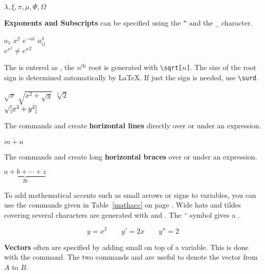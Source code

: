 \begin{example}
$\lambda,\xi,\pi,\mu,\Phi,\Omega$
\end{example}
 
\textbf{Exponents and Subscripts} can be specified using
the \verb|^| and the \verb|_| character.

\begin{example}
$a_{1}$ \qquad $x^{2}$ \qquad
$e^{-\alpha t}$ \qquad
$a^{3}_{ij}$\\
$e^{x^2} \neq {e^x}^2$
\end{example}

The \textbf{} is entered as , the
$n^\mathrm{th}$ root is generated with \verb|\sqrt[|$n$\verb|]|. The size of
the root sign is determined automatically by \LaTeX. If just the sign
is needed, use \verb|\surd|.

\begin{example}
$\sqrt{x}$ \qquad 
$\sqrt{ x^{2}+\sqrt{y} }$ 
\qquad $\sqrt[3]{2}$\\[3pt]
$\surd[x^2 + y^2]$
\end{example}

The commands  and  create
\textbf{horizontal lines} directly over or under an expression.
\begin{example}
$\overline{m+n}$
\end{example}

The commands  and  create
long \textbf{horizontal braces} over or under an expression.
\begin{example}
$\underbrace{ a+b+\cdots+z }_{26}$
\end{example}

 To add mathematical accents such as small
arrows or  signs to variables, you can use the commands
given in Table~\ref{mathacc} on page \pageref{mathacc}.  Wide hats and
tildes covering several characters are generated with 
and .  The \verb|'| symbol gives a
.

\begin{example}
\begin{displaymath}
y=x^{2}\qquad y'=2x\qquad y''=2
\end{displaymath}
\end{example}

\textbf{Vectors} often are specified by adding small
 on top of a variable. This is done with the
 command. The two commands  and
 are useful to denote the vector from $A$ to $B$.

